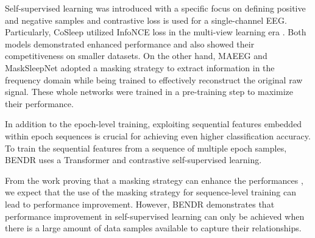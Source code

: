 Self-supervised learning was introduced with a specific focus on defining positive and negative samples \cite{9533305} and contrastive loss \cite{DBLP:journals/corr/abs-1807-03748} is used for a single-channel EEG. Particularly, CoSleep utilized InfoNCE loss in the multi-view learning era \cite{CoSleep_IEEE2021_multiview_with_CL}. Both models demonstrated enhanced performance and also showed their competitiveness on smaller datasets.
%
On the other hand, MAEEG \cite{chien2022maeeg} and MaskSleepNet \cite{MaskSleepNet2023_IEEE} adopted a masking strategy to extract information in the frequency domain while being trained to effectively reconstruct the original raw signal.
%
These whole networks were trained in a pre-training step to maximize their performance.


In addition to the epoch-level training, exploiting sequential features embedded within epoch sequences is crucial for achieving even higher classification accuracy. 
%
To train the sequential features from a sequence of multiple epoch samples, BENDR \cite{kostas2021bendr} uses a Transformer and contrastive self-supervised learning. 

From the work proving that a masking strategy can enhance the performances \cite{NIPS2013_bengio}, we expect that the use of the masking strategy for sequence-level training can lead to performance improvement.
%
However, BENDR demonstrates that performance improvement in self-supervised learning can only be achieved when there is a large amount of data samples available to capture their relationships. 


